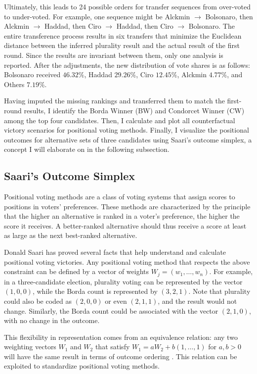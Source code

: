 \documentclass[hidelinks,11pt]{article} \usepackage[utf8]{inputenc}
\begin{document}
Ultimately, this leads to 24 possible orders for transfer sequences from over-voted to under-voted. For example, one sequence might be Alckmin \(\to\) Bolsonaro, then Alckmin \(\to\) Haddad, then Ciro \(\to\) Haddad, then Ciro \(\to\) Bolsonaro. The entire transference process results in six transfers that minimize the Euclidean distance between the inferred plurality result and the actual result of the first round. Since the results are invariant between them, only one analysis is reported. After the adjustments, the new distribution of vote shares is as follows: Bolsonaro received \(46.32\%\), Haddad \(29.26\%\), Ciro \(12.45\%\), Alckmin \(4.77\%\), and Others \(7.19\%\).


Having imputed the missing rankings and transferred them to match the first-round results, I identify the Borda Winner (BW) and Condorcet Winner (CW) among the top four candidates. Then, I calculate and plot all counterfactual victory scenarios for positional voting methods. Finally, I visualize the positional outcomes for alternative sets of three candidates using Saari's outcome simplex, a concept I will elaborate on in the following subsection.

\subsection{Saari's Outcome Simplex}

Positional voting methods are a class of voting systems that assign scores to positions in voters' preferences. These methods are characterized by the principle that the higher an alternative is ranked in a voter's preference, the higher the score it receives. A better-ranked alternative should thus receive a score at least as large as the next best-ranked alternative.

Donald Saari has proved several facts that help understand and calculate positional voting victories. Any positional voting method that respects the above constraint can be defined by a vector of weights \(W_{j} = (w_{1}, \ldots, w_{n})\). For example, in a three-candidate election, plurality voting can be represented by the vector \((1,0,0)\), while the Borda count is represented by \((3,2,1)\). Note that plurality could also be coded as \((2,0,0)\) or even \((2,1,1)\), and the result would not change. Similarly, the Borda count could be associated with the vector \((2,1,0)\), with no change in the outcome.

This flexibility in representation comes from an equivalence relation: any two weighting vectors \(W_{1}\) and \(W_{2}\) that satisfy \(W_{1} = aW_{2} + b(1,\ldots, 1)\) for \(a,b > 0\) will have the same result in terms of outcome ordering \parencite{saari1995basic}. This relation can be exploited to standardize positional voting methods.
\end{document}
